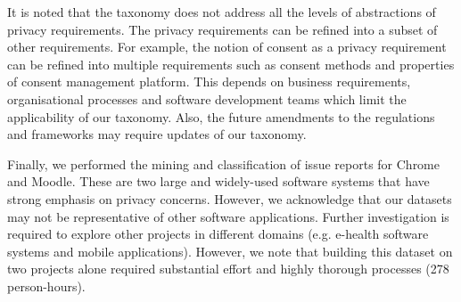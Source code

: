 \indent It is noted that the taxonomy does not address all the levels of abstractions of privacy requirements. The privacy requirements can be refined into a subset of other requirements. For example, the notion of consent as a privacy requirement can be refined into multiple requirements such as consent methods and properties of consent management platform. This depends on business requirements, organisational processes and software development teams which limit the applicability of our taxonomy. Also, the future amendments to the regulations and frameworks may require updates of our taxonomy. \\
\indent {}

Finally, we performed the mining and classification of issue reports for Chrome and Moodle. These are two large and widely-used software systems that have strong emphasis on privacy concerns. However, we acknowledge that our datasets may not be representative of other software applications. Further investigation is required to explore other projects in different domains (e.g. e-health software systems and mobile applications). However, we note that building this dataset on two projects alone required substantial effort and highly thorough processes (278 person-hours).


